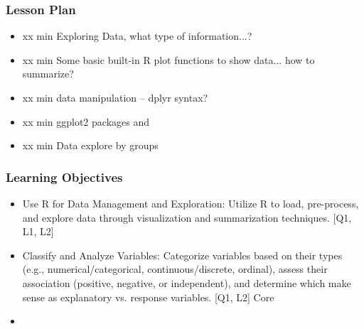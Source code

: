 

\begin{frame}
\frametitle{Lesson Plan}
\begin{itemize}
    \item xx min Exploring Data, what type of information...?
    \item xx min Some basic built-in R plot functions to show data... how to summarize?
    \item xx min data manipulation -- dplyr syntax? 
    \item xx min ggplot2 packages and  
    \item xx min Data explore by groups
\end{itemize}
\end{frame}


\begin{frame}
\frametitle{Learning Objectives}

\begin{itemize}
    \item Use R for Data Management and Exploration: Utilize R to load, pre-process, and explore data through visualization and summarization techniques. [Q1, L1, L2]
    \item Classify and Analyze Variables: Categorize variables based on their types (e.g., numerical/categorical, continuous/discrete, ordinal), assess their association (positive, negative, or independent), and determine which make sense as explanatory vs. response variables. [Q1, L2] Core
    \item 
\end{itemize}
\end{frame}





